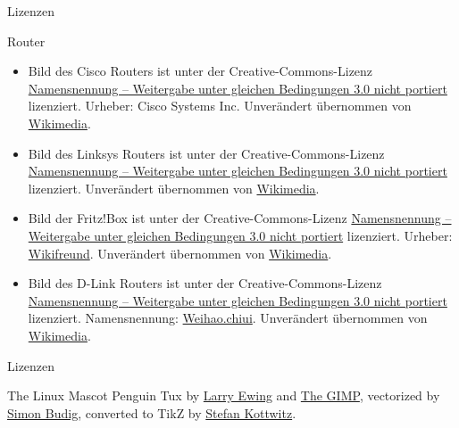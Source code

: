 \documentclass[t]{beamer}
\begin{document}
\begin{frame}{Lizenzen}
    \begin{block}{Router}
        \small
        \begin{itemize}
            \item Bild des Cisco Routers ist unter der Creative-Commons-Lizenz
                \href{https://creativecommons.org/licenses/by-sa/3.0/deed.de}{Namensnennung
                – Weitergabe unter gleichen Bedingungen 3.0 nicht portiert}
                lizenziert. Urheber: Cisco Systems Inc. Unverändert übernommen
                von
                \href{https://commons.wikimedia.org/wiki/File:Cisco7600seriesrouter.jpg}{Wikimedia}.
            \item Bild des Linksys Routers ist unter der
                Creative-Commons-Lizenz
                \href{https://creativecommons.org/licenses/by-sa/3.0/deed.de}{Namensnennung
                – Weitergabe unter gleichen Bedingungen 3.0 nicht portiert}
                lizenziert. Unverändert übernommen von
                \href{https://commons.wikimedia.org/wiki/File:Linksys_BEFSR41_Router_20040321.jpg}{Wikimedia}.
            \item Bild der Fritz!Box ist unter der Creative-Commons-Lizenz
                \href{https://creativecommons.org/licenses/by-sa/3.0/deed.de}{Namensnennung
                – Weitergabe unter gleichen Bedingungen 3.0 nicht portiert}
                lizenziert. Urheber:
                \href{https://commons.wikimedia.org/wiki/User:Wikifreund}{Wikifreund}.
                Unverändert übernommen von
                \href{https://commons.wikimedia.org/wiki/File:FRITZ!Box_6490_Cable.JPG}{Wikimedia}.
            \item Bild des D-Link Routers ist unter der Creative-Commons-Lizenz
                \href{https://creativecommons.org/licenses/by-sa/3.0/deed.de}{Namensnennung
                – Weitergabe unter gleichen Bedingungen 3.0 nicht portiert}
                lizenziert. Namensnennung:
                \href{https://zh.wikipedia.org/wiki/User:Weihao.chiu}{Weihao.chiui}.
                Unverändert übernommen von
                \href{https://commons.wikimedia.org/wiki/File:D-Link_DI-524.jpg}{Wikimedia}.
        \end{itemize}
        \normalsize
    \end{block}
\end{frame}

\begin{frame}{Lizenzen}
    \begin{block}{The Linux Mascot}
        Penguin Tux by \href{mailto:lewing@isc.tamu.edu}{Larry Ewing}
        and \href{http://isc.tamu.edu/~lewing/linux/}{The GIMP},
        vectorized by \href{http://www.home.unix-ag.org/simon/}{Simon Budig},
        converted to TikZ by
        \href{http://www.texample.net/weblog/2012/apr/28/tux-tex-tikz/}{Stefan Kottwitz}.
    \end{block}
\end{frame}
\end{document}
